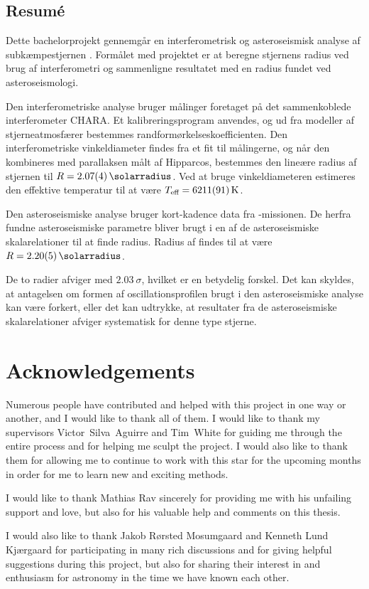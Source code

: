 \subsection*{Resumé}
{\small Dette bachelorprojekt gennemgår en interferometrisk og asteroseismisk analyse af subkæmpestjernen \mystar. Formålet med projektet er at beregne stjernens radius ved brug af interferometri og sammenligne resultatet med en radius fundet ved asteroseismologi. 

Den interferometriske analyse bruger målinger foretaget på det sammenkoblede interferometer CHARA. Et kalibreringsprogram anvendes, og ud fra modeller af stjerneatmosfærer bestemmes randformørkelseskoefficienten. Den interferometriske vinkeldiameter findes fra et fit til målingerne, og når den kombineres med parallaksen målt af Hipparcos, bestemmes den lineære radius af stjernen til $R = \SI{2.07 \pm 0.04}{\solarradius}$. Ved at bruge vinkeldiameteren estimeres den effektive temperatur til at være $\teff = \SI{6211 \pm 91}{\kelvin}$.

Den asteroseismiske analyse bruger kort-kadence data fra \kepler-missionen. De herfra fundne asteroseismiske parametre bliver brugt i en af de asteroseismiske skalarelationer til at finde radius. Radius af \mystar findes til at være $R = \SI{2.20 \pm 0.05}{\solarradius}$. 

De to radier afviger med $\SI{2.03}{\sigma}$, hvilket er en betydelig forskel. Det kan skyldes, at antagelsen om formen af oscillationsprofilen brugt i den asteroseismiske analyse kan være forkert, eller det kan udtrykke, at resultater fra de asteroseismiske skalarelationer afviger systematisk for denne type stjerne. \par
}
\clearpage
{} 
\section*{Acknowledgements}
\vspace{-5pt}
Numerous people have contributed and helped with this project in one way or another, and I would like to thank all of them. I would like to thank my supervisors Victor~Silva~Aguirre and Tim~White for guiding me through the entire process and for helping me sculpt the project. I would also like to thank them for allowing me to continue to work with this star for the upcoming months in order for me to learn new and exciting methods.

I would like to thank Mathias Rav sincerely for providing me with his unfailing support and love, but also for his  valuable help and comments on this thesis.

I would also like to thank Jakob Rørsted Mosumgaard and Kenneth Lund Kjærgaard
for participating in many rich discussions and for giving helpful suggestions during this project, but also for sharing their interest in and enthusiasm for astronomy in the time we have known each other.


\clearpage